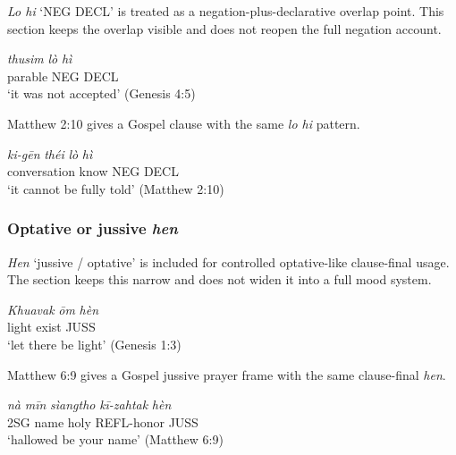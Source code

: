 \documentclass[
  11pt,
  a4paper,
]{article}
\newcommand{\tdim}[1]{\textit{#1}}
\newcommand{\tdimword}[1]{\textit{#1}}
\renewcommand{\textsc}[1]{{\footnotesize\MakeUppercase{#1}}}
\newcommand{\glossquote}[1]{`#1'}
\begin{document}
\tdim{Lo hi} \glossquote{NEG DECL} is treated as a
negation-plus-declarative overlap point. This section keeps the overlap
visible and does not reopen the full negation account.

\begin{exe}
\ex \label{ex:sfp-lo-hi-gen4-5}
\gll \tdimword{thusim} \tdimword{lò} \tdimword{hì} \\
     parable \textsc{neg} \textsc{decl} \\
\glt \glossquote{it was not accepted} (Genesis 4:5)
\end{exe}

Matthew 2:10 gives a Gospel clause with the same \tdim{lo hi} pattern.

\begin{exe}
\ex \label{ex:sfp-lo-hi-matt2-10}
\gll \tdimword{ki-gēn} \tdimword{théi} \tdimword{lò} \tdimword{hì} \\
     conversation know \textsc{neg} \textsc{decl} \\
\glt \glossquote{it cannot be fully told} (Matthew 2:10)
\end{exe}

\subsubsection{\texorpdfstring{Optative or jussive
\tdim{hen}}{Optative or jussive }}\label{optative-or-jussive}

\tdim{Hen} \glossquote{jussive / optative} is included for controlled
optative-like clause-final usage. The section keeps this narrow and does
not widen it into a full mood system.

\begin{exe}
\ex \label{ex:sfp-hen-gen1-3}
\gll \tdimword{Khuavak} \tdimword{ōm} \tdimword{hèn} \\
     light exist \textsc{juss} \\
\glt \glossquote{let there be light} (Genesis 1:3)
\end{exe}

Matthew 6:9 gives a Gospel jussive prayer frame with the same
clause-final \tdim{hen}.

\begin{exe}
\ex \label{ex:sfp-hen-matt6-9}
\gll \tdimword{nà} \tdimword{mīn} \tdimword{sìangtho} \tdimword{kī-zahtak} \tdimword{hèn} \\
     \textsc{2sg} name holy \textsc{refl}-honor \textsc{juss} \\
\glt \glossquote{hallowed be your name} (Matthew 6:9)
\end{exe}
\end{document}
